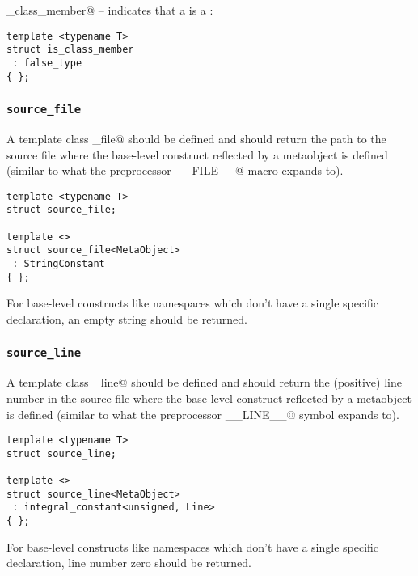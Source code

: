 \verb@is_class_member@ -- indicates that a  is a :
\begin{verbatim}
template <typename T>
struct is_class_member
 : false_type
{ };
\end{verbatim}

\subsubsection{\texttt{source\_file}}

A template class \verb@source_file@ should be defined and should return the
path to the source file where the base-level construct reflected by a
metaobject is defined (similar to what the preprocessor \verb@__FILE__@ macro
expands to).

\begin{verbatim}
template <typename T>
struct source_file;

template <>
struct source_file<MetaObject>
 : StringConstant
{ };
\end{verbatim}

For base-level constructs like namespaces which don't have a single specific
declaration, an empty string should be returned.

\subsubsection{\texttt{source\_line}}

A template class \verb@source_line@ should be defined and should return the (positive)
line number in the source file where the base-level construct reflected by a
metaobject is defined (similar to what the preprocessor \verb@__LINE__@ symbol
expands to).

\begin{verbatim}
template <typename T>
struct source_line;

template <>
struct source_line<MetaObject>
 : integral_constant<unsigned, Line>
{ };
\end{verbatim}

For base-level constructs like namespaces which don't have a single specific
declaration, line number zero should be returned.

